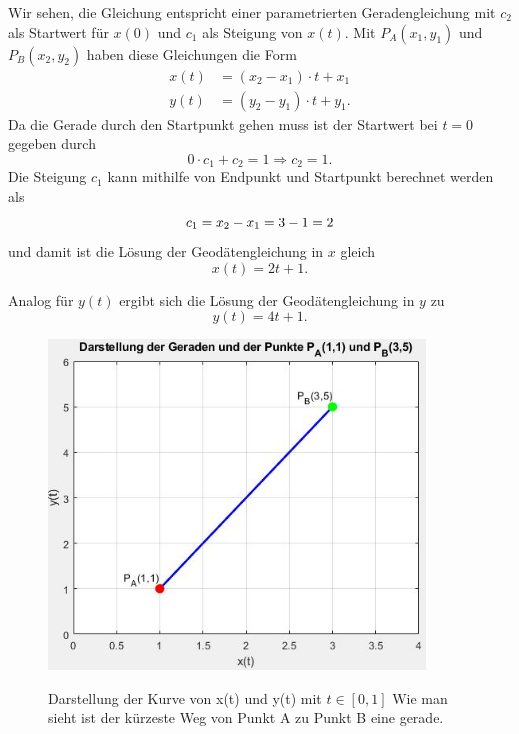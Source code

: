 Wir sehen, die Gleichung entspricht einer parametrierten Geradengleichung mit $c_2$ als Startwert für $x(0)$ und $c_1$ als Steigung von $x(t)$. 
Mit $P_A(x_1,y_1)$ und $P_B(x_2,y_2)$ haben diese Gleichungen die Form
\begin{align}
	x(t) &= (x_2 - x_1) \cdot t + x_1 \\
	y(t) &= (y_2 - y_1) \cdot t + y_1 .
\end{align}
Da die Gerade durch den Startpunkt gehen muss ist der Startwert bei $t=0$ gegeben durch
\begin{equation}
	0 \cdot c_1 + c_2 = 1 \Rightarrow c_2 = 1 .	
\end{equation}
Die Steigung $c_1$ kann mithilfe von Endpunkt und Startpunkt berechnet werden als
\begin{equation}
	c_1 = x_2 - x_1 \\ = 3-1 \\ = 2
\end{equation}
und damit ist die Lösung der Geodätengleichung in $x$ gleich
\begin{equation}
	x(t) = 2t + 1 .
	\label{geodaeten:equation:StaKartesisch:LoesungX}
\end{equation}

Analog für $y(t)$ ergibt sich die Lösung der Geodätengleichung in $y$ zu
\begin{equation}
	y(t) = 4t + 1 .
	\label{geodaeten:equation:StaKartesisch:LoesungX}
\end{equation}

\begin{figure}
	\centering
	\includegraphics[width=10cm]{papers/geodaeten/Abbildungen/Standardverfahren/Kartesisch}
	\label{geodaeten:figure:Standardverfahren:Kartesisch:figure1}
	\caption{Darstellung der Kurve von x(t) und y(t) mit $t \in [0 , 1]$ Wie man sieht ist der kürzeste Weg von Punkt A zu Punkt B eine gerade.}
\end{figure}

